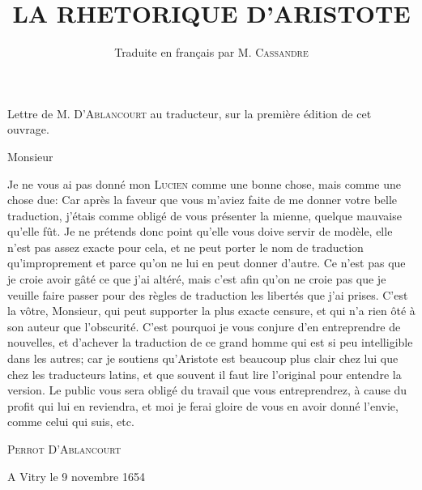 \documentclass[11pt]{book}
\title{LA 
RHETORIQUE 
D'ARISTOTE}
\author{Traduite en français par M. \textsc{Cassandre}}
\begin{document}
\maketitle

Lettre de M. \textsc{D'Ablancourt} au traducteur, sur la première édition de cet ouvrage. 

Monsieur

Je ne vous ai pas donné mon \textsc{Lucien} comme une 
bonne chose, mais comme une chose due: Car après 
la faveur que vous m'aviez faite de me donner votre 
belle traduction, j'étais comme obligé de vous
présenter la mienne, quelque mauvaise qu'elle fût. Je ne 
prétends donc point qu'elle vous doive servir de modèle,
elle n'est pas assez exacte pour cela, et ne peut porter
le nom de traduction qu'improprement et parce 
qu'on ne lui en peut donner d'autre. Ce n'est pas que 
je croie avoir gâté ce que j'ai altéré, mais c'est afin 
qu'on ne croie pas que je veuille faire passer pour des 
règles de traduction les libertés que j'ai prises. C'est la 
vôtre, Monsieur, qui peut supporter la plus exacte censure, 
et qui n'a rien ôté à son auteur que l'obscurité. 
C'est pourquoi je vous conjure d'en entreprendre de 
nouvelles, et d'achever la traduction de ce grand 
homme qui est si peu intelligible dans les autres; car je 
soutiens qu'Aristote est beaucoup plus clair chez lui que 
chez les traducteurs latins, et que souvent il faut 
lire l'original pour entendre la version. Le public vous 
sera obligé du travail que vous entreprendrez, à cause 
du profit qui lui en reviendra, et moi je ferai gloire de 
vous en avoir donné l'envie, comme celui qui suis, etc.

\textsc{Perrot D'Ablancourt}

A Vitry le 9 novembre 1654

\tableofcontents






\end{document}

